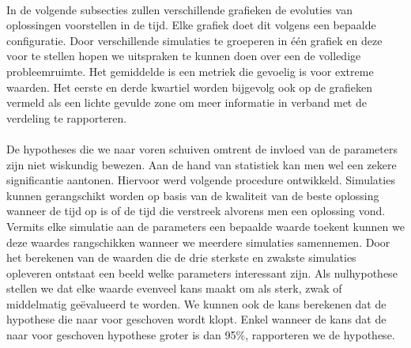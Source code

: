 \paragraph{}
In de volgende subsecties zullen verschillende grafieken de evoluties van oplossingen voorstellen in de tijd. Elke grafiek doet dit volgens een bepaalde configuratie. Door verschillende simulaties te groeperen in \'e\'en grafiek en deze voor te stellen hopen we uitspraken te kunnen doen over een de volledige probleemruimte. Het gemiddelde is een metriek die gevoelig is voor extreme waarden. Het eerste en derde kwartiel worden bijgevolg ook op de grafieken vermeld als een lichte gevulde zone om meer informatie in verband met de verdeling te rapporteren.

\paragraph{}
De hypotheses die we naar voren schuiven omtrent de invloed van de parameters zijn niet wiskundig bewezen. Aan de hand van statistiek kan men wel een zekere significantie aantonen. Hiervoor werd volgende procedure ontwikkeld. Simulaties kunnen gerangschikt worden op basis van de kwaliteit van de beste oplossing wanneer de tijd op is of de tijd die verstreek alvorens men een oplossing vond. Vermits elke simulatie aan de parameters een bepaalde waarde toekent kunnen we deze waardes rangschikken wanneer we meerdere simulaties samennemen. Door het berekenen van de waarden die de drie sterkste en zwakste simulaties opleveren ontstaat een beeld welke parameters interessant zijn. Als nulhypothese stellen we dat elke waarde evenveel kans maakt om als sterk, zwak of middelmatig ge\"evalueerd te worden. We kunnen ook de kans berekenen dat de hypothese die naar voor geschoven wordt klopt. Enkel wanneer de kans dat de naar voor geschoven hypothese groter is dan 95\%, rapporteren we de hypothese.

